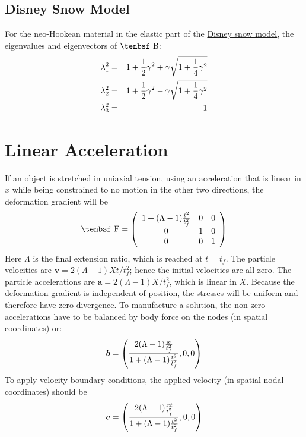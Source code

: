 \documentclass[11pt]{book}
\renewcommand{\vec}[1]{\boldsymbol{#1}}
\def\B{\hbox{\tenbsf B}}
\def\F{\hbox{\tenbsf F}}
\begin{document}
\subsection{Disney Snow Model}

For the neo-Hookean material in the elastic part of the \hyperref[NHM]{Disney snow model}, the eigenvalues and eigenvectors of $\B$:
\begin{eqnarray}
   \lambda_1^2 & = & 1 + {1\over2}\gamma^2 + \gamma\sqrt{1+{1\over4}\gamma^2} \\
   \lambda_2^2 & = & 1 + {1\over2}\gamma^2 - \gamma\sqrt{1+{1\over4}\gamma^2} \\
   \lambda_3^2 & = & 1 \\
\end{eqnarray}

\section{Linear Acceleration}

If an object is stretched in uniaxial tension, using an acceleration that is linear in $x$ while being constrained to no motion in the other two directions, the deformation gradient will be
\begin{equation}
    \F = \left(\begin{array}{ccc} 1 + (\Lambda-1){t^2\over t_f^2} & 0 & 0 \\
               0 & 1 & 0 \\
               0 & 0 & 1 \end{array} \right)
\end{equation}
Here $\Lambda$ is the final extension ratio, which is reached at $t=t_f$. The particle velocities are $\vec v = 2(\Lambda-1)Xt/t_f^2$; hence the initial velocities are all zero. The particle accelerations are $\vec a = 2(\Lambda-1)X/t_f^2$, which is linear in $X$. Because the deformation gradient is independent of position, the stresses will be uniform and therefore have zero divergence. To manufacture a solution, the non-zero accelerations have to be balanced by body force on the nodes (in spatial coordinates) or:
\begin{equation}
    \vec b = \left({2(\Lambda-1){x\over t_f^2}\over 1+(\Lambda-1){t^2\over t_f^2}}, 0, 0\right)
\end{equation}
To apply velocity boundary conditions, the applied velocity (in spatial nodal coordinates) should be
\begin{equation}
     \vec v = \left({2(\Lambda-1){xt\over t_f^2}\over 1+ (\Lambda-1){t^2\over t_f^2}},0,0\right)
\end{equation}
\end{document}
